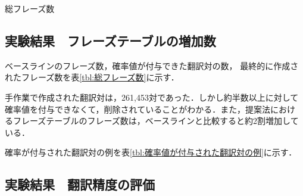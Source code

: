 \documentclass[japanese]{jnlp_1.4}
\begin{document}
\begin{table}[b]
\vspace{-1\baselineskip}
\caption{総フレーズ数}
\label{tbl:総フレーズ数}

\end{table}


\subsection{実験結果　フレーズテーブルの増加数}

ベースラインのフレーズ数，確率値が付与できた翻訳対の数，
最終的に作成されたフレーズ数を表\ref{tbl:総フレーズ数}に示す．

手作業で作成された翻訳対は，261,453対であった．しかし約半数以上に対して
確率値を付与できなくて，削除されていることがわかる．また，提案法におけ
るフレーズテーブルのフレーズ数は，ベースラインと比較すると約2割増加して
いる．

確率が付与された翻訳対の例を表\ref{tbl:確率値が付与された翻訳対の例}に示す．


\subsection{実験結果　翻訳精度の評価}
\label{subsec:翻訳精度の評価}
\end{document}
